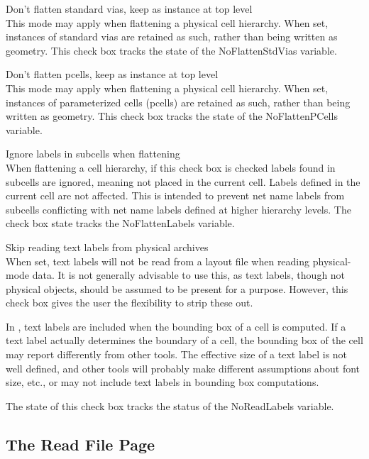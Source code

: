 \begin{description}
\item{\cb Don't flatten standard vias, keep as instance at top level}\\
This mode may apply when flattening a physical cell hierarchy.  When
set, instances of standard vias are retained as such, rather than
being written as geometry.  This check box tracks the state of the
{\et NoFlattenStdVias} variable.

\item{\cb Don't flatten pcells, keep as instance at top level}\\
This mode may apply when flattening a physical cell hierarchy.  When
set, instances of parameterized cells (pcells) are retained as such,
rather than being written as geometry.  This check box tracks the
state of the {\et NoFlattenPCells} variable.

\item{\cb Ignore labels in subcells when flattening}\\
When flattening a cell hierarchy, if this check box is checked labels
found in subcells are ignored, meaning not placed in the current cell. 
Labels defined in the current cell are not affected.  This is intended
to prevent net name labels from subcells conflicting with net name
labels defined at higher hierarchy levels.  The check box state tracks
the {\et NoFlattenLabels} variable.

\item{\cb Skip reading text labels from physical archives}\\
When set, text labels will not be read from a layout file when reading
physical-mode data.  It is not generally advisable to use this, as
text labels, though not physical objects, should be assumed to be
present for a purpose.  However, this check box gives the user the
flexibility to strip these out.

In {\Xic}, text labels are included when the bounding box of a cell is
computed.  If a text label actually determines the boundary of a cell,
the bounding box of the cell may report differently from other tools. 
The effective size of a text label is not well defined, and other
tools will probably make different assumptions about font size, etc.,
or may not include text labels in bounding box computations.

The state of this check box tracks the status of the {\et
NoReadLabels} variable.
\end{description}

\subsection{The {\cb Read File} Page}

